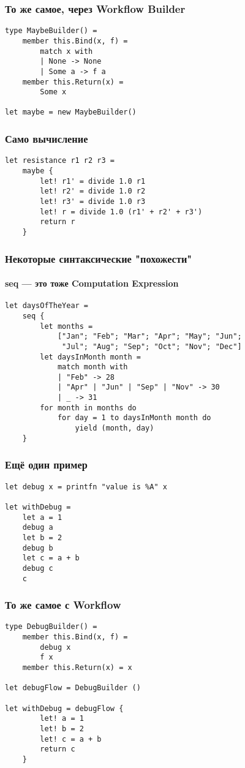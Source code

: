 \documentclass[xetex,mathserif,serif]{beamer}
\begin{document}
	\begin{frame}[fragile]
		\frametitle{То же самое, через Workflow Builder}
		\begin{verbatim}
type MaybeBuilder() =
    member this.Bind(x, f) = 
        match x with
        | None -> None
        | Some a -> f a
    member this.Return(x) = 
        Some x
   
let maybe = new MaybeBuilder()
		\end{verbatim}
\end{frame}

	\begin{frame}[fragile]
		\frametitle{Само вычисление}
		\begin{verbatim}
let resistance r1 r2 r3 = 
    maybe {
        let! r1' = divide 1.0 r1
        let! r2' = divide 1.0 r2
        let! r3' = divide 1.0 r3
        let! r = divide 1.0 (r1' + r2' + r3')
        return r
    }
		\end{verbatim}
\end{frame}

	\begin{frame}[fragile]
		\frametitle{Некоторые синтаксические "похожести"}
		\framesubtitle{seq --- это тоже Computation Expression}
		\begin{verbatim}
let daysOfTheYear =
    seq {
        let months =
            ["Jan"; "Feb"; "Mar"; "Apr"; "May"; "Jun";
             "Jul"; "Aug"; "Sep"; "Oct"; "Nov"; "Dec"]
        let daysInMonth month =
            match month with
            | "Feb" -> 28
            | "Apr" | "Jun" | "Sep" | "Nov" -> 30
            | _ -> 31
        for month in months do
            for day = 1 to daysInMonth month do
                yield (month, day)
    }
		\end{verbatim}
\end{frame}

	\begin{frame}[fragile]
		\frametitle{Ещё один пример}
		\begin{verbatim}
let debug x = printfn "value is %A" x

let withDebug = 
    let a = 1
    debug a
    let b = 2
    debug b
    let c = a + b
    debug c
    c
		\end{verbatim}
\end{frame}

	\begin{frame}[fragile]
		\frametitle{То же самое с Workflow}
		\begin{verbatim}
type DebugBuilder() =
    member this.Bind(x, f) = 
        debug x 
        f x
    member this.Return(x) = x

let debugFlow = DebugBuilder ()

let withDebug = debugFlow {
        let! a = 1
        let! b = 2
        let! c = a + b
        return c
    }
		\end{verbatim}
\end{frame}
\end{document}
